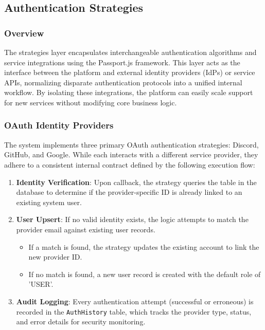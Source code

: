 \subsection{Authentication Strategies}

\subsubsection{Overview}
The strategies layer encapsulates interchangeable authentication algorithms and service integrations using the Passport.js framework. This layer acts as the interface between the platform and external identity providers (IdPs) or service APIs, normalizing disparate authentication protocols into a unified internal workflow. By isolating these integrations, the platform can easily scale support for new services without modifying core business logic.

\subsubsection{OAuth Identity Providers}
The system implements three primary OAuth authentication strategies: Discord, GitHub, and Google. While each interacts with a different service provider, they adhere to a consistent internal contract defined by the following execution flow:

\begin{enumerate}
    \item \textbf{Identity Verification}: Upon callback, the strategy queries the \texttt{} table in the database to determine if the provider-specific ID is already linked to an existing system user.
    \item \textbf{User Upsert}: If no valid identity exists, the logic attempts to match the provider email against existing user records. 
    \begin{itemize}
        \item If a match is found, the strategy updates the existing account to link the new provider ID.
        \item If no match is found, a new user record is created with the default role of 'USER'.
    \end{itemize}
    \item \textbf{Audit Logging}: Every authentication attempt (successful or erroneous) is recorded in the \texttt{AuthHistory} table, which tracks the provider type, status, and error details for security monitoring.
\end{enumerate}

